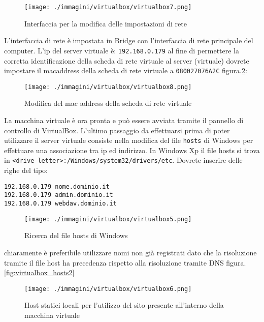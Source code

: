 \begin{figure}[H]
 \centering
 \texttt{[image: ./immagini/virtualbox/virtualbox7.png]}
 \caption{Interfaccia per la modifica delle impostazioni di rete}
 \label{fig:virtualbox_net1}
\end{figure}

L'interfaccia di rete è impostata in Bridge con l'interfaccia di rete principale del computer. L'ip del server virtuale è: \texttt{192.168.0.179} al fine di permettere la corretta identificazione della scheda di rete virtuale al server (virtuale) dovrete impostare il macaddress della scheda di rete virtuale a \texttt{080027076A2C} figura.\ref{fig:virtualbox_net2}:

\begin{figure}[H]
 \centering
 \texttt{[image: ./immagini/virtualbox/virtualbox8.png]}
 \caption{Modifica del mac address della scheda di rete virtuale}
 \label{fig:virtualbox_net2}
\end{figure}

La macchina virtuale è ora pronta e può essere avviata tramite il pannello di controllo di VirtualBox. L'ultimo passaggio da effettuarsi prima di poter utilizzare il server virtuale consiste nella modifica del file \texttt{hosts} di Windows per effettuare una associazione tra ip ed indirizzo. In Windows Xp il file hosts si trova in \texttt{<drive letter>:/Windows/system32/drivers/etc}. Dovrete inserire delle righe del tipo:
\begin{verbatim}
192.168.0.179 nome.dominio.it
192.168.0.179 admin.dominio.it
192.168.0.179 webdav.dominio.it
\end{verbatim}

\begin{figure}[H]
 \centering
 \texttt{[image: ./immagini/virtualbox/virtualbox5.png]}
 \caption{Ricerca del file hosts di Windows}
 \label{fig:virtualbox_hosts1}
\end{figure}

chiaramente è preferibile utilizzare nomi non già registrati dato che la risoluzione tramite il file host ha precedenza rispetto alla risoluzione tramite DNS figura.\ref{fig:virtualbox_hosts2}

\begin{figure}[H]
 \centering
 \texttt{[image: ./immagini/virtualbox/virtualbox6.png]}
 \caption{Host statici locali per l'utilizzo del sito presente all'interno della macchina virtuale}
 \label{fig:virtualbox_host2}
\end{figure}
